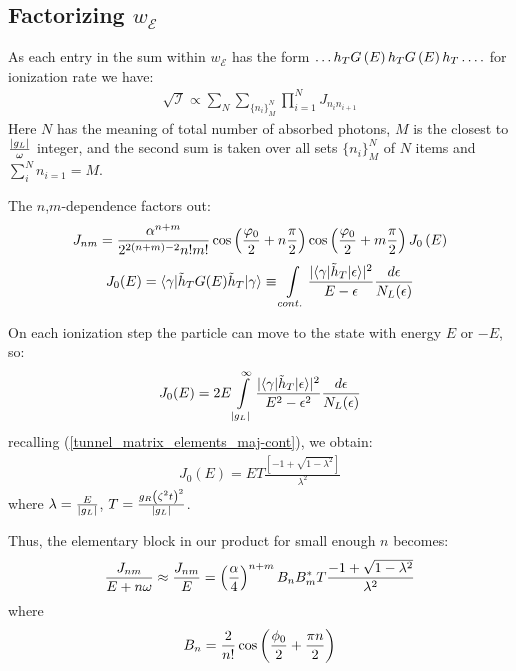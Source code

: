 \subsection{Factorizing $ w_\mathcal{E} $}
As each entry in the sum within $ w_{\mathcal{E}} $ has the form $ \dots h_TG\left(E\right)h_TG\left(E\right)h_T\dots. $  for ionization rate we have:
\begin{gather}
	\sqrt{\mathcal{I}}\propto
	\sum_N \sum_{\{n_i\}_M^N}\prod_{i=1}^{N}J_{n_in_{i+1}}
\end{gather}
Here $ N $ has the meaning of total number of absorbed photons, $ M $ is the closest to $ \frac{\left|g_L\right|}{\omega }$ integer, and the second sum is taken over all sets $ \{n_i\}_M^N $ of $ N $ items and $ \sum_i^N n_{i=1} = M$.

 The $ n $,$ m $-dependence factors out:
\begin{gather}
J_{nm}
=
	\frac{\alpha^{n+m}}
	{2^{2\left(n+m\right)-2}n!m!}
	\cos\left(\frac{\varphi_{0}}{2}+n\frac{\pi}{2}\right)
	\cos\left(\frac{\varphi_{0}}{2}+m\frac{\pi}{2}\right)
	J_0\left(E\right)
\end{gather}
\begin{gather}
	J_{0}(E)
	=
	\langle\gamma|\tilde{h}_{T}G(E)\tilde{h}_{T}|\gamma\rangle
	\equiv
	\intop_{cont.}\frac{|\langle\gamma|\tilde{h}_{T}|\epsilon\rangle|^{2}}{E-\epsilon}\frac{d\epsilon}{N_L(\epsilon)}
\end{gather}

On each ionization step  the particle can move to the state with energy $ E $ or $ -E $, so:
\begin{gather}
	J_{0}(E)
	=
	2E\intop_{|g_{L}|}^{\infty}\frac{|\langle\gamma|\tilde{h}_{T}|\epsilon\rangle|^{2}}{E^{2}-\epsilon^{2}}\frac{d\epsilon}{N_L(\epsilon)}
\end{gather}
recalling (\ref{tunnel_matrix_elements_maj-cont}), we obtain:
\begin{gather}
		J_{0}(E)
		=
		ET\frac{\left[-1+\sqrt{1-\lambda^{2}}\right]}{\lambda^{2}}
\end{gather}
where $ \lambda = \frac{E}{\left|g_L\right|} $, $ T=\frac{g_R\left(\zeta^2t\right)^2}{\left|g_L\right|} $.

Thus, the elementary block  in our product for small enough $ n $ becomes:
\begin{gather}
	\frac{J_{nm}}{E+n\omega}
	\approx
	\frac{J_{nm}}{E}
	=
	\left(\frac{\alpha}{4}\right)^{n+m}
	B_n B_m^* T
	\frac{-1+\sqrt{1-\lambda^2}}{\lambda^2}
\end{gather}
where
\begin{gather}
	B_n=
	\frac{2}{n!}\cos\left(\frac{\phi_0}{2}+\frac{\pi n}{2}\right)
\end{gather}

